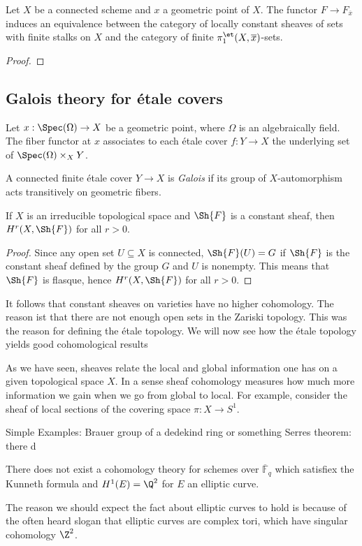 \begin{proposition}
	Let $X$ be a connected scheme and $x$ a geometric point of $X$. The functor $F \to F_{\overline{x}}$ induces an equivalence between the category of locally constant sheaves of sets with finite stalks on $X$ and the category of finite $\pi_1^{\et}(X,\overline{x})$-sets.
\end{proposition}
\begin{proof}

\end{proof}

\subsection{Galois theory for \'etale covers}
\begin{definition}
	Let $x: \Spec(\Omega) \to X$ be a geometric point, where $\Omega$ is an algebraically field. The fiber functor at $x$ associates to each \'etale cover $f: Y \to X$ the underlying set of $\Spec(\Omega) \times_X Y$.
\end{definition}

\begin{definition}
	A connected finite \'etale cover $Y \to X$ is \textit{Galois} if its group of $X$-automorphism acts transitively on geometric fibers.
\end{definition}

\begin{theorem}
	If $X$ is an irreducible topological space and $\Sh{F}$ is a constant sheaf, then $H^r(X, \Sh{F})$ for all $r>0$.
\end{theorem}
\begin{proof}
	Since any open set $U \subseteq X$ is connected, $\Sh{F}(U) = G$ if $\Sh{F}$ is the constant sheaf defined by the group $G$ and $U$ is nonempty. This means that $\Sh{F}$ is flasque, hence $H^r(X, \Sh{F})$ for all $r>0$.
\end{proof}
It follows that constant sheaves on varieties have no higher cohomology. The reason ist that there are not enough open sets in the Zariski topology. This was the reason for defining the \'etale topology. We will now see how the \'etale topology yields good cohomological results

As we have seen, sheaves relate the local and global information one has on a given topological space $X$. In a sense sheaf cohomology measures how much more information we gain when we go from global to local. For example, consider the sheaf of local sections of the covering space $\pi : X \to S^1$.

Simple Examples:
Brauer group of a dedekind ring or something
Serres theorem: there d
\begin{theorem}
	There does not exist a cohomology theory for schemes over $\overline{\mathbb{F}}_q$ which satisfiex the Kunneth formula and $H^1(E) = \Q^2$ for $E$ an elliptic curve.
\end{theorem}
The reason we should expect the fact about elliptic curves to hold is because of the often heard slogan that elliptic curves are complex tori, which have singular cohomology $\Z^2$.
